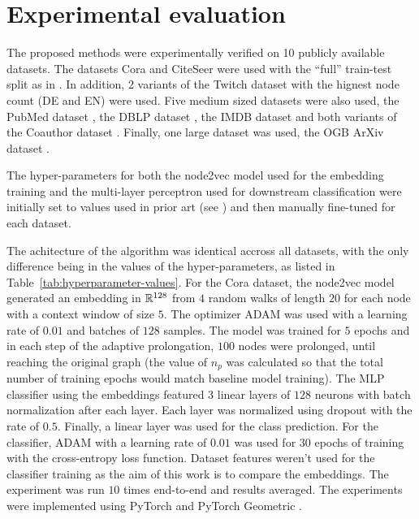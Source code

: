 \section{Experimental evaluation}\label{sec:experimental-evaluation}

The proposed methods were experimentally verified on 10 publicly available datasets. The datasets Cora and CiteSeer \cite{yang_revisiting_2016} were used with the \enquote{full} train-test split as in \cite{chen_fastgcn_2018}. In addition, 2 variants of the Twitch dataset \cite{rozemberczki_multi-scale_2021} with the hignest node count (DE and EN) were used. Five medium sized datasets were also used, the PubMed dataset \cite{yang_revisiting_2016}, the DBLP dataset \cite{bojchevski_deep_2018}, the IMDB dataset \cite{fu_magnn_2020} and both variants of the Coauthor dataset \cite{shchur_pitfalls_2019}. Finally, one large dataset was used, the OGB ArXiv dataset \cite{hu_open_2021}.

The hyper-parameters for both the node2vec model used for the embedding training and the multi-layer perceptron used for downstream classification were initially set to values used in prior art (see \cite{fey_fast_2019,hu_open_2021}) and then manually fine-tuned for each dataset.

The achitecture of the algorithm was identical accross all datasets, with the only difference being in the values of the hyper-parameters, as listed in Table~\ref{tab:hyperparameter-values}. For the Cora dataset, the node2vec model generated an embedding in \( \mathbb{R}^{128} \) from \( 4 \) random walks of length \( 20 \) for each node with a context window of size \( 5 \). The optimizer ADAM \cite{kingma_adam:_2017} was used with a learning rate of \( 0.01 \) and batches of \( 128 \) samples. The model was trained for \( 5 \) epochs and in each step of the adaptive prolongation, \( 100 \) nodes were prolonged, until reaching the original graph (the value of \( n_p \) was calculated so that the total number of training epochs would match baseline model training). The MLP classifier using the embeddings featured \( 3 \) linear layers of \( 128 \) neurons with batch normalization after each layer. Each layer was normalized using dropout \cite{srivastava_dropout_2014} with the rate of \( 0.5 \). Finally, a linear layer was used for the class prediction. For the classifier, ADAM with a learning rate of \( 0.01 \) was used for \( 30 \) epochs of training with the cross-entropy loss function. Dataset features weren't used for the classifier training as the aim of this work is to compare the embeddings. The experiment was run \( 10 \) times end-to-end and results averaged. The experiments were implemented using PyTorch \cite{paszke_pytorch_2019} and PyTorch Geometric \cite{fey_fast_2019}.

